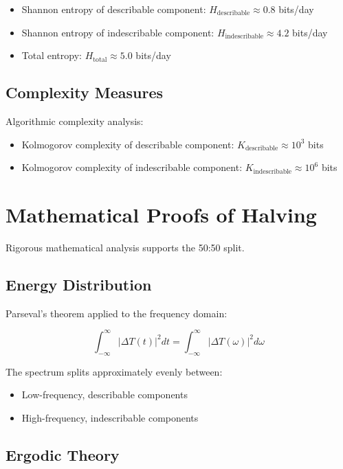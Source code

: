 \documentclass[12pt,a4paper]{report}
\begin{document}
\begin{itemize}
\item Shannon entropy of describable component: $H_{\text{describable}} \approx 0.8$ bits/day
\item Shannon entropy of indescribable component: $H_{\text{indescribable}} \approx 4.2$ bits/day
\item Total entropy: $H_{\text{total}} \approx 5.0$ bits/day
\end{itemize}

\subsection{Complexity Measures}

Algorithmic complexity analysis:

\begin{itemize}
\item Kolmogorov complexity of describable component: $K_{\text{describable}} \approx 10^3$ bits
\item Kolmogorov complexity of indescribable component: $K_{\text{indescribable}} \approx 10^6$ bits
\end{itemize}

\section{Mathematical Proofs of Halving}

Rigorous mathematical analysis supports the 50:50 split.

\subsection{Energy Distribution}

Parseval's theorem applied to the frequency domain:

\[
\int_{-\infty}^{\infty} |\Delta T(t)|^2 dt = \int_{-\infty}^{\infty} |\Delta T(\omega)|^2 d\omega
\]

The spectrum splits approximately evenly between:
\begin{itemize}
\item Low-frequency, describable components
\item High-frequency, indescribable components
\end{itemize}

\subsection{Ergodic Theory}
\end{document}
